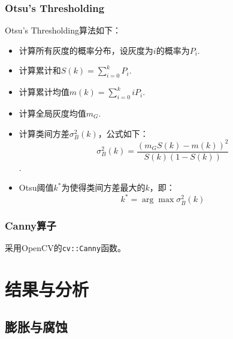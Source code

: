 \documentclass{article}
\begin{document}
\subsubsection{Otsu's Thresholding}

Otsu's Thresholding算法如下：
\begin{itemize}
    \item 计算所有灰度的概率分布，设灰度为$i$的概率为$P_i$.
    \item 计算累计和$S(k)=\sum_{i=0}^kP_i$.
    \item 计算累计均值$m(k)=\sum_{i=0}^kiP_i$.
    \item 计算全局灰度均值$m_G$.
    \item 计算类间方差$\sigma_B^2(k)$，公式如下：$$\sigma_B^2(k)=\frac{(m_GS(k)-m(k))^2}{S(k)(1-S(k))}$$.
    \item Otsu阈值$k^*$为使得类间方差最大的$k$，即：$$k^*=\arg \max \sigma_B^2(k)$$
\end{itemize}

\subsubsection{Canny算子}

采用OpenCV的\texttt{cv::Canny}函数。

\section{结果与分析}

\subsection{膨胀与腐蚀}
\end{document}
